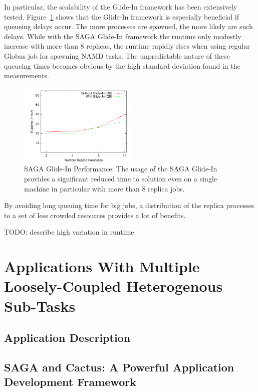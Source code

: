 \documentclass[conference,final]{IEEEtran}
\begin{document}
In particular, the scalability of the Glide-In framework has been
extensively tested.  Figure~\ref{fig:perf_remd_glidin} shows that the
Glide-In framework is especially beneficial if queueing delays
occur. The more processes are spawned, the more likely are such
delays. While with the SAGA Glide-In framework the runtime only
modestly increase with more than 8 replicas, the runtime rapidly rises
when using regular Globus job for spawning NAMD tasks. The
unpredictable nature of these queueing times becomes obvious by the
high standard deviation found in the measurements.

\begin{figure}[htbp]
    \centering
        \includegraphics[width=0.5\textwidth]{perf_remd_glidin.pdf}
        \caption{SAGA Glide-In Performance: The usage of the SAGA
          Glide-In provides a significant reduced time to solution
          even on a single machine in particular with more than 8
          replica jobs.}
    \label{fig:perf_remd_glidin}
\end{figure}


By avoiding long queuing time for big jobs, a distribution of the
replica processes to a set of less crowded resources provides a lot of
benefits.

TODO: describe high variation in runtime



\section{Applications With Multiple Loosely-Coupled Heterogenous
Sub-Tasks}

\subsection{Application Description}

\subsection{SAGA and Cactus: A Powerful Application Development
  Framework}
\end{document}
